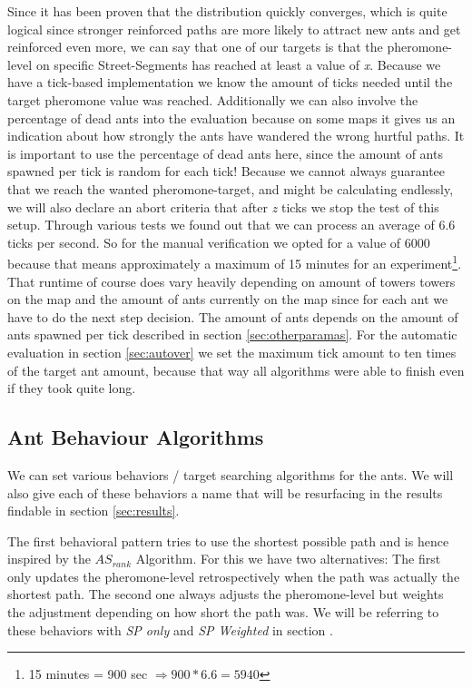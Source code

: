 Since it has been proven that the distribution quickly converges\cite[P. 15]{maniezzo2002ant}, which is quite logical since stronger reinforced paths are more likely to attract new ants and get reinforced even more, we can say that one of our targets is that the pheromone-level on specific Street-Segments has reached at least a value of \textit{x}.
Because we have a tick-based implementation we know the amount of ticks needed until the target pheromone value was reached. Additionally we can also involve the percentage of dead ants into the evaluation because on some maps it gives us an indication about how strongly the ants have wandered  the wrong hurtful paths. It is important to use the percentage of dead ants here, since the amount of ants spawned per tick is random for each tick!
Because we cannot always guarantee that we reach the wanted pheromone-target, and might be calculating endlessly, we will also declare an abort criteria that after \textit{z} ticks we stop the test of this setup. Through various tests we found out that we can process an average of 6.6 ticks per second. So for the manual verification we opted for a value of 6000 because that means approximately a maximum of 15 minutes for an experiment\footnote{15 minutes = 900 sec  $\Rightarrow 900 * 6.6 = 5940$}. That runtime of course does vary heavily depending on amount of towers towers on the map and the amount of ants currently on the map since for each ant we have to do the next step decision. The amount of ants depends on the amount of ants spawned per tick described in section \ref{sec:otherparamas}.
For the automatic evaluation in section \ref{sec:autover} we set the maximum tick amount to ten times of the target ant amount, because that way all algorithms were able to finish even if they took quite long. 


\subsection{Ant Behaviour Algorithms}
\label{sec:behavior}
We can set various behaviors / target searching algorithms for the ants. We will also give each of these behaviors a name that will be resurfacing in the results findable in section \ref{sec:results}.

The first behavioral pattern tries to use the shortest possible path and is hence inspired by the $AS_{rank}$ Algorithm\cite{zecchin2007ant}.
For this we have two alternatives: The first only updates the pheromone-level retrospectively when the path was actually the shortest path. The second one always adjusts the pheromone-level but weights the adjustment depending on how short the path was.
We will be referring to these behaviors with \textit{SP only} and \textit{SP Weighted} in section .

